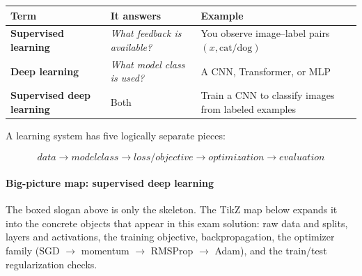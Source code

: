 \documentclass[11pt,a4paper]{article}
\theoremstyle{definition}
\begin{document}
{\footnotesize
\setlength{\tabcolsep}{3pt}
\renewcommand{\arraystretch}{1.2}
\noindent
\begin{tabularx}{\linewidth}{|
  >{\raggedright\arraybackslash}p{3.2cm}|
  >{\raggedright\arraybackslash}X|
  >{\raggedright\arraybackslash}X|
}
\hline
\textbf{Term} & \textbf{It answers} & \textbf{Example} \\
\hline
\textbf{Supervised learning} & \textit{What feedback is available?} & You observe image--label pairs $(x, \text{cat/dog})$ \\
\hline
\textbf{Deep learning} & \textit{What model class is used?} & A CNN, Transformer, or MLP \\
\hline
\textbf{Supervised deep learning} & Both & Train a CNN to classify images from labeled examples \\
\hline
\end{tabularx}
}

A learning system has five logically separate pieces:

\[\boxed{data \rightarrow model class \rightarrow loss/objective \rightarrow optimization \rightarrow evaluation}\]

\paragraph{Big-picture map: supervised deep learning}

The boxed slogan above is only the skeleton. The TikZ map below expands it into the concrete objects that appear in this exam solution: raw data and splits, layers and activations, the training objective, backpropagation, the optimizer family (SGD $\to$ momentum $\to$ RMSProp $\to$ Adam), and the train/test regularization checks.
\end{document}
